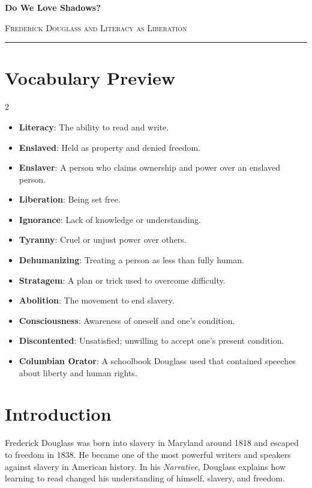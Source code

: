 \documentclass[12pt]{article}
\begin{document}
\begin{center}
{\LARGE\bfseries Do We Love Shadows?}\par\vspace{0.25em}
{\large\scshape Frederick Douglass and Literacy as Liberation}\par\vspace{0.45em}
\rule{0.82\textwidth}{0.4pt}\par\vspace{0.7em}
\end{center}

\section*{Vocabulary Preview}
\begin{multicols}{2}
\begin{itemize}[leftmargin=*, itemsep=0.18em]
\item \textbf{Literacy}: The ability to read and write.
\item \textbf{Enslaved}: Held as property and denied freedom.
\item \textbf{Enslaver}: A person who claims ownership and power over an enslaved person.
\item \textbf{Liberation}: Being set free.
\item \textbf{Ignorance}: Lack of knowledge or understanding.
\item \textbf{Tyranny}: Cruel or unjust power over others.
\item \textbf{Dehumanizing}: Treating a person as less than fully human.
\item \textbf{Stratagem}: A plan or trick used to overcome difficulty.
\item \textbf{Abolition}: The movement to end slavery.
\item \textbf{Consciousness}: Awareness of oneself and one's condition.
\item \textbf{Discontented}: Unsatisfied; unwilling to accept one's present condition.
\item \textbf{Columbian Orator}: A schoolbook Douglass used that contained speeches about liberty and human rights.
\end{itemize}
\end{multicols}

\section*{Introduction}
Frederick Douglass was born into slavery in Maryland around 1818 and escaped to freedom in 1838. He became one of the most powerful writers and speakers against slavery in American history. In his \textit{Narrative}, Douglass explains how learning to read changed his understanding of himself, slavery, and freedom.
\end{document}
